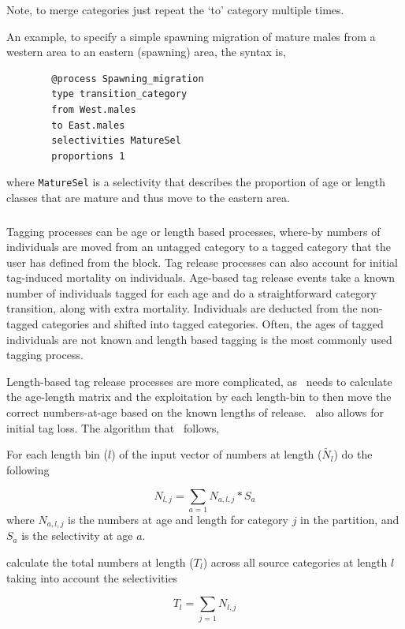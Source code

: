 Note, to merge categories just repeat the `to' category multiple times.

An example, to specify a simple spawning migration of mature males from a western area to an eastern (spawning) area, the syntax is,
{\small{\begin{verbatim}
		@process Spawning_migration
		type transition_category
		from West.males
		to East.males
		selectivities MatureSel
		proportions 1
		\end{verbatim}}}

where \texttt{MatureSel} is a selectivity that describes the proportion of age or length classes that are mature and thus move to the eastern area.

\subsubsection{}\label{sub:tag_release}
Tagging processes can be age or length based processes, where-by numbers of individuals are moved from an untagged category to a tagged category that the user has defined from the  block. Tag release processes can also account for initial tag-induced mortality on individuals. Age-based tag release events take a known number of individuals tagged for each age and do a straightforward category transition, along with extra mortality. Individuals are deducted from the non-tagged categories and shifted into tagged categories. Often, the ages of tagged individuals are not known and length based tagging is the most commonly used tagging process.


Length-based tag release processes are more complicated, as \CNAME\ needs to calculate the age-length matrix and the exploitation by each length-bin to then move the correct numbers-at-age based on the known lengths of release. \CNAME\ also allows for initial tag loss. The algorithm that \CNAME\ follows,


For each length bin ($l$) of the input vector of numbers at length ($\tilde{N_l}$) do the following

$$N_{l,j} = \sum_{a = 1}N_{a,l,j} * S_a$$
where $N_{a,l,j}$ is the numbers at age and length for category $j$ in the partition, and $S_a$ is the selectivity at age $a$.


calculate the total numbers at length ($T_l$) across all source categories at length $l$ taking into account the selectivities

$$T_l = \sum_{j = 1}N_{l,j}$$

